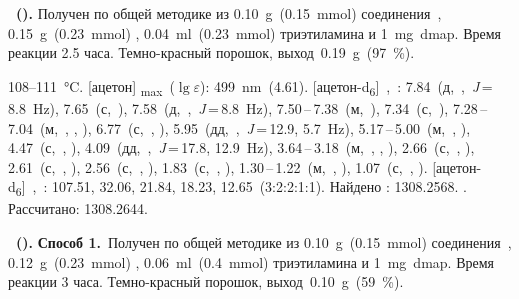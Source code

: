 \textbf{~().} 
Получен по общей методике из \SI{0.10}{\gram}~(\SI{0.15}{\milli\mole}) соединения~, \SI{0.15}{\gram}~(\SI{0.23}{\milli\mole}) , \SI{0.04}{\milli\litre}~(\SI{0.23}{\milli\mole}) триэтиламина и \SI{1}{\milli\gram}~\ac{dmap}.
Время реакции 2.5 часа.
Темно-красный порошок, выход~\SI{0.19}{\gram}~(\SI{97}{\percent}).
\begin{experimental}
     108--\SI{111}{\celsius}.
    [ацетон] \chemlambda\textsubscript{max}~($\lg \varepsilon$): \SI{499}{\nano\metre}~(4.61).
    [ацетон-d\textsubscript{6}]~\chemdelta,~\si{\ppm}: 7.84~(д,~,~\textit{J}\,=\,8.8~\si{\hertz}), 7.65~(с,~), 7.58~(д,~,~\textit{J}\,=\,8.8~\si{\hertz}), 7.50\,--\,7.38~(м,~), 7.34~(с,~), 7.28\,--\,7.04~(м,~, , ), 6.77~(с,~, ), 5.95~(дд,~,~\textit{J}\,=\,12.9, 5.7~\si{\hertz}), 5.17\,--\,5.00~(м,~, ), 4.47~(с,~, ), 4.09~(дд,~,~\textit{J}\,=\,17.8, 12.9~\si{\hertz}), 3.64\,--\,3.18~(м,~, , ), 2.66~(с,~, ), 2.61~(с,~, ), 2.56~(с,~, ), 1.83~(с,~, ), 1.30\,--\,1.22~(м,~, ), 1.07~(с,~, ).
    [ацетон-d\textsubscript{6}]~\chemdelta,~\si{\ppm}: 107.51, 32.06, 21.84, 18.23, 12.65~(3:2:2:1:1).
     Найдено \ce{[M + H]+}: \num{1308.2568}. . Рассчитано: \ce{[M + H]} \num{1308.2644}.
\end{experimental}

\textbf{~().} 
\textbf{Способ 1.}~Получен по общей методике из \SI{0.10}{\gram}~(\SI{0.15}{\milli\mole}) соединения~, \SI{0.12}{\gram}~(\SI{0.23}{\milli\mole}) , \SI{0.06}{\milli\litre}~(\SI{0.4}{\milli\mole}) триэтиламина и \SI{1}{\milli\gram}~\ac{dmap}.
Время реакции 3 часа.
Темно-красный порошок, выход~\SI{0.10}{\gram}~(\SI{59}{\percent}).

